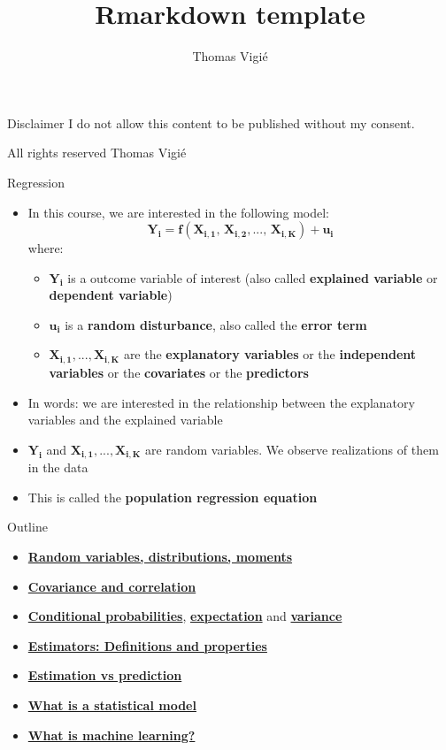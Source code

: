 \documentclass[
  ignorenonframetext,
  aspectratio=169]{beamer}
\author{}
\date{\vspace{-2.5em}}    %
\title{Rmarkdown template}
\author{Thomas Vigié}
\date{}
\providecommand{\tightlist}{%
  \setlength{\itemsep}{0pt}\setlength{\parskip}{0pt}}
\begin{document}
\frame{\titlepage}

\begin{frame}{Disclaimer}
\protect\hypertarget{disclaimer}{}
I do not allow this content to be published without my consent.

All rights reserved  Thomas Vigié
\end{frame}

\begin{frame}{Regression}
\protect\hypertarget{regression}{}
\begin{itemize}
\tightlist
\item
  In this course, we are interested in the following model:
  \begin{equation}
  \bm{Y_i = f(X_{i,1},\,X_{i,2},..., \, X_{i,K}) + u_i }
  \label{regression equation}
  \end{equation} where:

  \begin{itemize}
  \tightlist
  \item
    \(\bm{Y_i}\) is a outcome variable of interest (also called
    \textbf{explained variable} or \textbf{dependent variable})
  \item
    \(\bm{u_i}\) is a \textbf{random disturbance}, also called the
    \textbf{error term}
  \item
    \(\bm{X_{i,1},...,X_{i,K}}\) are the \textbf{explanatory variables}
    or the \textbf{independent variables} or the \textbf{covariates} or
    the \textbf{predictors}
  \end{itemize}
\item
  In words: we are interested in the relationship between the
  explanatory variables and the explained variable
\item
  \(\bm{Y_i}\) and \(\bm{X_{i,1},...,X_{i,K}}\) are random variables. We
  observe realizations of them in the data
\item
  This is called the \textbf{population regression equation}
\end{itemize}
\end{frame}

\begin{frame}{Outline \label{outline}}
\protect\hypertarget{outline}{}
\begin{itemize}
\tightlist
\item
  \hyperlink{rv}{\textbf{Random variables, distributions, moments}}
\item
  \hyperlink{cov}{\textbf{Covariance and correlation}}
\item
  \hyperlink{condrv}{\textbf{Conditional probabilities}},
  \hyperlink{cond exp}{\textbf{expectation}} and
  \hyperlink{cond var}{\textbf{variance}}
\item
  \hyperlink{estimators}{\textbf{Estimators: Definitions and properties}}
\item
  \hyperlink{est vs pred}{\textbf{Estimation vs prediction}}
\item
  \hyperlink{statmod}{\textbf{What is a statistical model}}
\item
  \hyperlink{ML}{\textbf{What is machine learning?}}
\end{itemize}
\end{frame}
\end{document}
